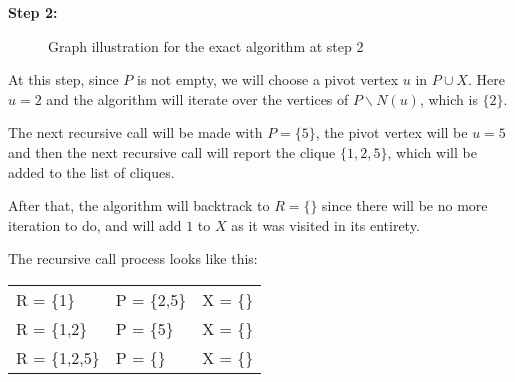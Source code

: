 \begin{minipage}{\linewidth}
    \textbf{Step 2:}

    \begin{minipage}{0.4\textwidth}
        \begin{figure}[H]
            \centering
            \caption{Graph illustration for the exact algorithm at step 2}
            \label{fig:exact-mewc-step2}
        \end{figure}
    \end{minipage}
    \hspace{0.04\linewidth}
    \begin{minipage}{0.55\textwidth}
        At this step, since $P$ is not empty, we will choose a pivot vertex $u$
        in $P\cup X$. Here $u = 2$ and the algorithm will iterate over the
        vertices of $P\backslash N(u)$, which is $\{2\}$. \bigskip

        The next recursive call will be made with $P = \{5\}$, the pivot vertex
        will be $u = 5$ and then the next recursive call will report the clique
        $\{1,2,5\}$, which will be added to the list of cliques. \bigskip

        After that, the algorithm will backtrack to $R=\{\}$ since there will be
        no more iteration to do, and will add $1$ to $X$ as it was visited in
        its entirety. \bigskip

        The recursive call process looks like this:
        \begin{center}
            \begin{tabular}{|lll|}
                \hline
                R = \{1\}     & P = \{2,5\} & X = \{\} \\
                R = \{1,2\}   & P = \{5\}   & X = \{\} \\
                R = \{1,2,5\} & P = \{\}    & X = \{\} \\
                \hline
            \end{tabular}
        \end{center}
    \end{minipage}
\end{minipage} \bigskip

